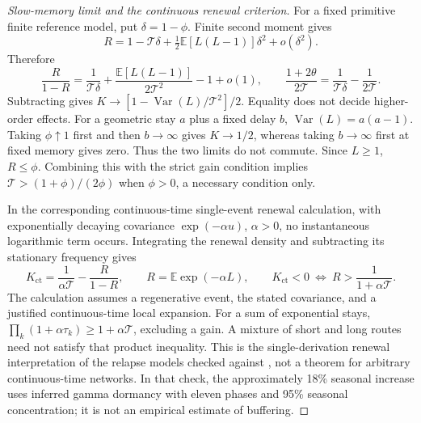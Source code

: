 \begin{proof}[Slow-memory limit and the continuous renewal criterion]
For a fixed primitive finite reference model, put \(\delta=1-\phi\). Finite second moment gives
\[
 R=1-\mathcal T\delta+\tfrac12\mathbb E[L(L-1)]\delta^2+o(\delta^2).
\]
Therefore
\[
 \frac R{1-R}=\frac1{\mathcal T\delta}
 +\frac{\mathbb E[L(L-1)]}{2\mathcal T^2}-1+o(1),\qquad
 \frac{1+2\theta}{2\mathcal T}=\frac1{\mathcal T\delta}-\frac1{2\mathcal T}.
\]
Subtracting gives \(K\to[1-\operatorname{Var}(L)/\mathcal T^2]/2\). Equality does not decide higher-order effects. For a geometric stay \(a\) plus a fixed delay \(b\), \(\operatorname{Var}(L)=a(a-1)\). Taking \(\phi\uparrow1\) first and then \(b\to\infty\) gives \(K\to1/2\), whereas taking \(b\to\infty\) first at fixed memory gives zero. Thus the two limits do not commute. Since \(L\geq1\), \(R\leq\phi\). Combining this with the strict gain condition implies \(\mathcal T>(1+\phi)/(2\phi)\) when \(\phi>0\), a necessary condition only.

In the corresponding continuous-time single-event renewal calculation, with exponentially decaying covariance \(\exp(-\alpha u)\), \(\alpha>0\), no instantaneous logarithmic term occurs. Integrating the renewal density and subtracting its stationary frequency gives
\begin{equation}\label{eq:mech-renewal-ct}
 K_{\mathrm{ct}}=\frac1{\alpha\mathcal T}-\frac R{1-R},\qquad
 R=\mathbb E\exp(-\alpha L),\qquad
 K_{\mathrm{ct}}<0\ \Longleftrightarrow\ R>\frac1{1+\alpha\mathcal T}.
\end{equation}
The calculation assumes a regenerative event, the stated covariance, and a justified continuous-time local expansion. For a sum of exponential stays, \(\prod_k(1+\alpha\tau_k)\geq1+\alpha\mathcal T\), excluding a gain. A mixture of short and long routes need not satisfy that product inequality. This is the single-derivation renewal interpretation of the relapse models checked against \citet{white2016}, not a theorem for arbitrary continuous-time networks. In that check, the approximately 18\% seasonal increase uses inferred gamma dormancy with eleven phases and 95\% seasonal concentration; it is not an empirical estimate of buffering.
\end{proof}

